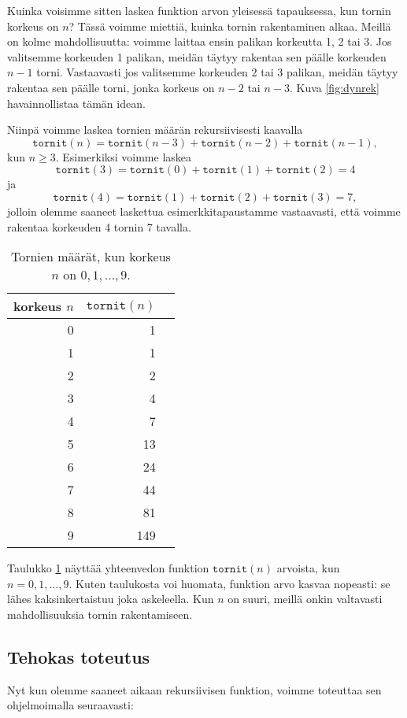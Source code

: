 Kuinka voisimme sitten laskea funktion arvon yleisessä tapauksessa,
kun tornin korkeus on $n$?
Tässä voimme miettiä, kuinka tornin rakentaminen alkaa.
Meillä on kolme mahdollisuutta: voimme laittaa ensin palikan
korkeutta 1, 2 tai 3.
Jos valitsemme korkeuden 1 palikan, meidän täytyy rakentaa
sen päälle korkeuden $n-1$ torni.
Vastaavasti jos valitsemme korkeuden 2 tai 3 palikan,
meidän täytyy rakentaa sen päälle torni,
jonka korkeus on $n-2$ tai $n-3$.
Kuva \ref{fig:dynrek} havainnollistaa tämän idean.

Niinpä voimme laskea tornien määrän rekursiivisesti kaavalla
\[
\texttt{tornit}(n) = \texttt{tornit}(n-3)+\texttt{tornit}(n-2)+\texttt{tornit}(n-1),
\]
kun $n \ge 3$.
Esimerkiksi voimme laskea
\[
\texttt{tornit}(3) = \texttt{tornit}(0)+\texttt{tornit}(1)+\texttt{tornit}(2)=4
\]
ja
\[
\texttt{tornit}(4) = \texttt{tornit}(1)+\texttt{tornit}(2)+\texttt{tornit}(3)=7,
\]
jolloin olemme saaneet laskettua esimerkkitapaustamme vastaavasti,
että voimme rakentaa korkeuden 4 tornin 7 tavalla.

\begin{table}
\center
\begin{tabular}{rrr}
korkeus $n$ & $\texttt{tornit}(n)$ \\
\hline
0 & 1 \\
1 & 1 \\
2 & 2 \\
3 & 4 \\
4 & 7 \\
5 & 13 \\
6 & 24 \\
7 & 44 \\
8 & 81 \\
9 & 149 \\
\end{tabular}
\caption{Tornien määrät, kun korkeus $n$ on $0,1,\dots,9$.}
\label{tab:dyntor}
\end{table}

Taulukko \ref{tab:dyntor} näyttää yhteenvedon funktion
$\texttt{tornit}(n)$ arvoista, kun $n=0,1,\dots,9$.
Kuten taulukosta voi huomata, funktion arvo kasvaa nopeasti:
se lähes kaksinkertaistuu joka askeleella.
Kun $n$ on suuri,
meillä onkin valtavasti mahdollisuuksia tornin rakentamiseen.

\subsection{Tehokas toteutus}

Nyt kun olemme saaneet aikaan rekursiivisen funktion,
voimme toteuttaa sen ohjelmoimalla seuraavasti:

